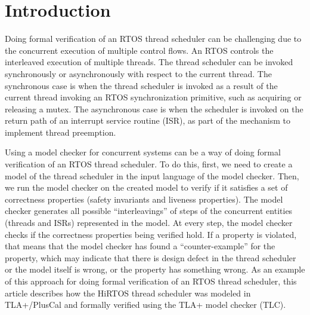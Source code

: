 \documentclass[sigplan,anonymous,10pt]{acmart}
\begin{document}


\received{\today}

\maketitle

\section{Introduction}

Doing formal verification of an RTOS thread scheduler can be challenging
due to the concurrent execution of multiple control flows. An RTOS
controls the interleaved execution of multiple threads.
The thread scheduler can be invoked synchronously or asynchronously
with respect to the current thread. The synchronous case is when
the thread scheduler is invoked as a result of the current thread
invoking an RTOS synchronization primitive, such as acquiring or
releasing a mutex.
The asynchronous case is when the scheduler is invoked on the return
path of an interrupt service routine (ISR), as part of the mechanism
to implement thread preemption.

Using a model checker for concurrent systems can be a way of doing
formal verification of an RTOS thread scheduler. To do this, first,
we need to create a model of the thread scheduler in the input language
of the model checker. Then, we run the model checker on the created model
to verify if it satisfies a set of correctness properties (safety invariants
and liveness properties). The model checker generates all possible
``interleavings'' of steps of the concurrent entities (threads and ISRs)
represented in the model. At every step, the model checker checks if the
correctness properties being verified hold. If a property is violated,
that means that the model checker has found a ``counter-example'' for the
property, which may indicate that there is design defect in the thread
scheduler or the model itself is wrong, or the property has something 
wrong.
As an example of this approach for doing formal verification of an RTOS
thread scheduler, this article describes how the HiRTOS thread scheduler
was modeled in TLA+/PlusCal and formally verified using the TLA+ model 
checker (TLC). 
\end{document}
